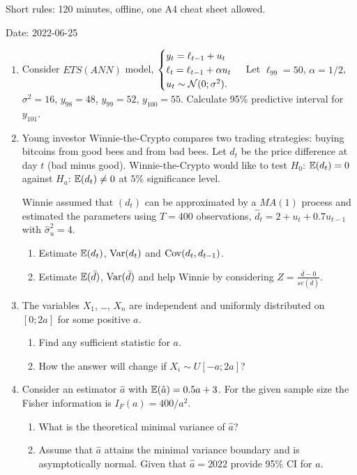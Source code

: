 Short rules: 120 minutes, offline, one A4 cheat sheet allowed.

Date: 2022-06-25

\begin{enumerate}

\item Consider $ETS(ANN)$ model,
	$
	\begin{cases}
	y_t = \ell_{t-1} + u_t \\
	\ell_t = \ell_{t-1} + \alpha u_t \\
	u_t \sim \mathcal{N}(0;\sigma^2). \\
	\end{cases}
	$
Let $\ell_{99} = 50$, $\alpha = 1/2$, $\sigma^2 = 16$, $y_{98} = 48$, $y_{99} = 52$, $y_{100} = 55$. Calculate 95\% predictive interval for $y_{101}$.

\item Young investor Winnie-the-Crypto compares two trading strategies: buying bitcoins from good bees and from bad bees. 
Let $d_t$ be the price difference at day $t$ (bad minus good). 
Winnie-the-Crypto would like to test $H_0$: $\operatorname{\mathbb{E}}(d_t) = 0$ against $H_a$: $\operatorname{\mathbb{E}}(d_t) \neq 0$ at $5\%$ significance level.

Winnie assumed that $(d_t)$ can be approximated by a $MA(1)$ process and estimated the parameters using $T=400$ observations, $\hat d_t = 2 + u_t + 0.7 u_{t-1}$ 
with $\hat\sigma^2_u = 4$.

\begin{enumerate}
	\item Estimate $\operatorname{\mathbb{E}}(d_t)$, $\operatorname{Var}(d_t)$ and $\operatorname{Cov}(d_t, d_{t-1})$.
	\item Estimate $\operatorname{\mathbb{E}}(\bar d)$, $\operatorname{Var}(\bar d)$ and help Winnie by considering $Z = \frac{\bar d - 0}{se(\bar d)}$.
\end{enumerate}



\item The variables $X_1$, \ldots, $X_n$ are independent and uniformly distributed on $[0; 2a]$ for some positive $a$. 

\begin{enumerate}
	\item Find any sufficient statistic for $a$. 
	\item How the answer will change if $X_i \sim U[-a; 2a]$?
\end{enumerate}


\item Consider an estimator $\hat a$ with $\operatorname{\mathbb{E}}(\hat a) = 0.5a + 3$. For the given sample size the Fisher information is $I_F(a) = 400/a^2$.
\begin{enumerate}
	\item What is the theoretical minimal variance of $\hat a$?
	\item Assume that $\hat a$ attains the minimal variance boundary and is asymptotically normal. Given that $\hat a = 2022$ provide 95\% CI for $a$.
\end{enumerate}


\end{enumerate}
